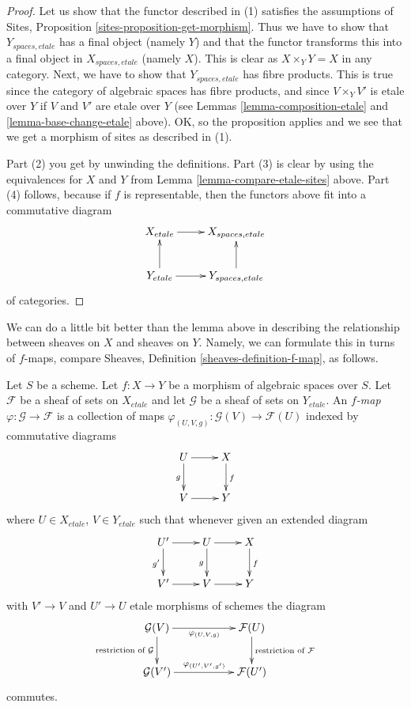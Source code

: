 \begin{proof}
Let us show that the functor described in (1) satisfies the assumptions
of Sites, Proposition \ref{sites-proposition-get-morphism}.
Thus we have to show that
$Y_{spaces, etale}$ has a final object (namely $Y$) and that
the functor transforms this into a final object in $X_{spaces, etale}$
(namely $X$). This is clear as $X \times_Y Y = X$ in any category.
Next, we have to show that $Y_{spaces, etale}$ has fibre products.
This is true since the category of algebraic spaces has fibre products,
and since $V \times_Y V'$ is etale over $Y$ if $V$ and $V'$ are etale
over $Y$ (see Lemmas \ref{lemma-composition-etale} and
\ref{lemma-base-change-etale} above).
OK, so the proposition applies and we see that we get a morphism
of sites as described in (1).

\medskip\noindent
Part (2) you get by unwinding the definitions.
Part (3) is clear by using the equivalences for $X$ and $Y$
from Lemma \ref{lemma-compare-etale-sites} above.
Part (4) follows, because if $f$ is representable, then the
functors above fit into a commutative diagram
$$
\xymatrix{
X_{etale} \ar[r] &
X_{spaces, etale} \\
Y_{etale} \ar[r] \ar[u] &
Y_{spaces, etale} \ar[u]
}
$$
of categories.
\end{proof}

\noindent
We can do a little bit better than the lemma above in describing
the relationship between sheaves on $X$ and sheaves on $Y$.
Namely, we can formulate this in turns of $f$-maps, compare
Sheaves, Definition \ref{sheaves-definition-f-map}, as follows.

\begin{definition}
\label{definition-f-map}
Let $S$ be a scheme.
Let $f : X \to Y$ be a morphism of algebraic spaces over $S$.
Let $\mathcal{F}$ be a sheaf of sets on $X_{etale}$ and
let $\mathcal{G}$ be a sheaf of sets on $Y_{etale}$.
An {\it $f$-map $\varphi : \mathcal{G} \to \mathcal{F}$}
is a collection of maps
$\varphi_{(U,V,g)} : \mathcal{G}(V) \to \mathcal{F}(U)$
indexed by commutative diagrams
$$
\xymatrix{
U \ar[d]_g \ar[r] & X \ar[d]^f \\
V \ar[r] & Y
}
$$
where $U \in X_{etale}$, $V \in Y_{etale}$ such that whenever given
an extended diagram
$$
\xymatrix{
U' \ar[r] \ar[d]_{g'} & U \ar[d]_g \ar[r] & X \ar[d]^f \\
V' \ar[r] & V \ar[r] & Y
}
$$
with $V' \to V$ and $U' \to U$ etale morphisms of schemes the diagram
$$
\xymatrix{
\mathcal{G}(V)
\ar[rr]_{\varphi_{(U, V, g)}}
\ar[d]_{\text{restriction of }\mathcal{G}} & &
\mathcal{F}(U)
\ar[d]^{\text{restriction of }\mathcal{F}} \\
\mathcal{G}(V')
\ar[rr]^{\varphi_{(U', V', g')}} & &
\mathcal{F}(U')
}
$$
commutes.
\end{definition}

